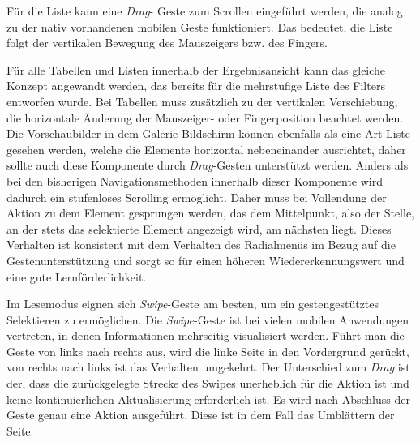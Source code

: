 Für die Liste kann eine \textit{Drag}- Geste zum Scrollen eingeführt werden, die analog zu der nativ vorhandenen mobilen Geste funktioniert. Das bedeutet, die Liste folgt der vertikalen Bewegung des Mauszeigers bzw. des Fingers.\par
{}
Für alle Tabellen und Listen innerhalb der Ergebnisansicht kann das gleiche Konzept angewandt werden, das bereits für die mehrstufige Liste des Filters entworfen wurde. Bei Tabellen muss zusätzlich zu der vertikalen Verschiebung, die horizontale Änderung der Mauszeiger- oder Fingerposition beachtet werden. Die Vorschaubilder in dem Galerie-Bildschirm können ebenfalls als eine Art Liste gesehen werden, welche die Elemente horizontal nebeneinander ausrichtet, daher sollte auch diese Komponente durch \textit{Drag}-Gesten unterstützt werden. Anders als bei den bisherigen Navigationsmethoden innerhalb dieser Komponente wird dadurch ein stufenloses Scrolling ermöglicht. Daher muss bei Vollendung der Aktion zu dem Element gesprungen werden, das dem Mittelpunkt, also der Stelle, an der stets das selektierte Element angezeigt wird, am nächsten liegt. Dieses Verhalten ist konsistent mit dem Verhalten des Radialmenüs im Bezug auf die Gestenunterstützung und sorgt so für einen höheren Wiedererkennungswert und eine gute Lernförderlichkeit.\par
Im Lesemodus eignen sich \textit{Swipe}-Geste am besten, um ein gestengestütztes Selektieren zu ermöglichen. Die \textit{Swipe}-Geste ist bei vielen mobilen Anwendungen vertreten, in denen Informationen mehrseitig visualisiert werden. Führt man die Geste von links nach rechts aus, wird die linke Seite in den Vordergrund gerückt, von rechts nach links ist das Verhalten umgekehrt. Der Unterschied zum \textit{Drag} ist der, dass die zurückgelegte Strecke des Swipes unerheblich für die Aktion ist und keine kontinuierlichen Aktualisierung erforderlich ist. Es wird nach Abschluss der Geste genau eine Aktion ausgeführt. Diese ist in dem Fall das Umblättern der Seite.\par
